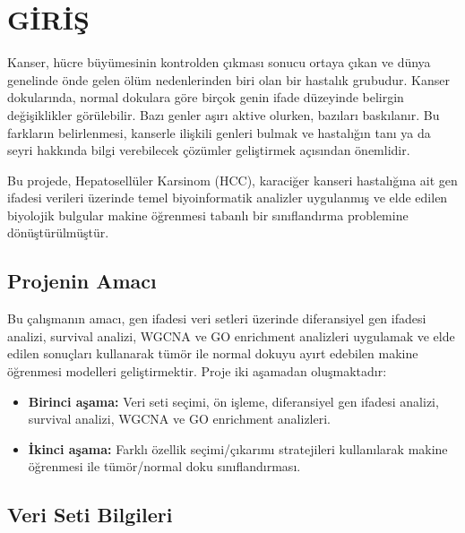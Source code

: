 \documentclass[12pt,a4paper,oneside]{report}
\begin{document}

\chapter{GİRİŞ}

Kanser, hücre büyümesinin kontrolden çıkması sonucu ortaya çıkan ve dünya genelinde önde gelen ölüm nedenlerinden biri olan bir hastalık grubudur. Kanser dokularında, normal dokulara göre birçok genin ifade düzeyinde belirgin değişiklikler görülebilir.
Bazı genler aşırı aktive olurken, bazıları baskılanır. Bu farkların belirlenmesi, kanserle ilişkili genleri bulmak ve hastalığın tanı ya da seyri hakkında bilgi verebilecek çözümler geliştirmek açısından önemlidir.

Bu projede, Hepatosellüler Karsinom (HCC), karaciğer kanseri hastalığına ait gen ifadesi verileri üzerinde temel biyoinformatik analizler uygulanmış ve elde edilen biyolojik bulgular makine öğrenmesi tabanlı bir sınıflandırma problemine dönüştürülmüştür.

\section{Projenin Amacı}

Bu çalışmanın amacı, gen ifadesi veri setleri üzerinde diferansiyel gen ifadesi analizi, survival analizi, WGCNA ve GO enrichment analizleri uygulamak ve elde edilen sonuçları kullanarak tümör ile normal dokuyu ayırt edebilen makine öğrenmesi modelleri geliştirmektir. Proje iki aşamadan oluşmaktadır:

\begin{itemize}[leftmargin=*]
\item \textbf{Birinci aşama:} Veri seti seçimi, ön işleme, diferansiyel gen ifadesi analizi, survival analizi, WGCNA ve GO enrichment analizleri.
\item \textbf{İkinci aşama:} Farklı özellik seçimi/çıkarımı stratejileri kullanılarak makine öğrenmesi ile tümör/normal doku sınıflandırması.
\end{itemize}

\section{Veri Seti Bilgileri}
\end{document}
